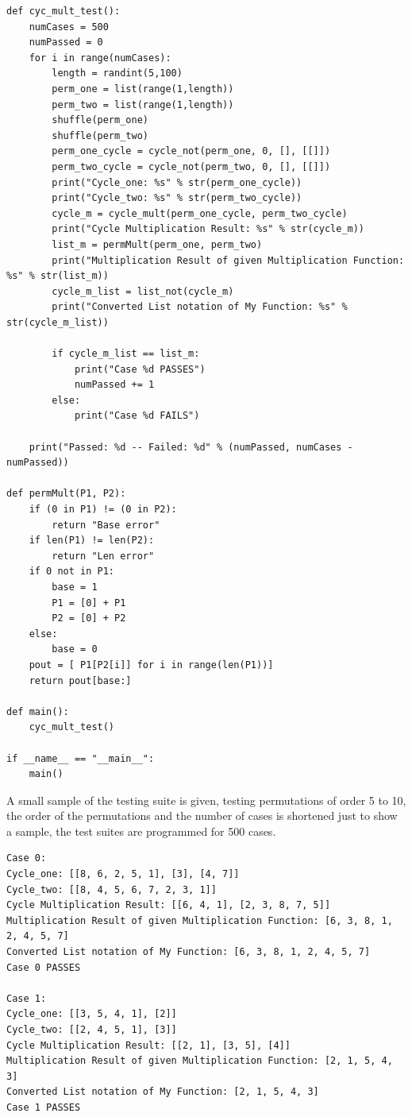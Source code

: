 \documentclass[12pt]{article}
\begin{document}
\begin{enumerate}
\begin{lstlisting}
def cyc_mult_test():
    numCases = 500
    numPassed = 0
    for i in range(numCases):
        length = randint(5,100)
        perm_one = list(range(1,length))
        perm_two = list(range(1,length))
        shuffle(perm_one)
        shuffle(perm_two)
        perm_one_cycle = cycle_not(perm_one, 0, [], [[]])
        perm_two_cycle = cycle_not(perm_two, 0, [], [[]])
        print("Cycle_one: %s" % str(perm_one_cycle))
        print("Cycle_two: %s" % str(perm_two_cycle))
        cycle_m = cycle_mult(perm_one_cycle, perm_two_cycle)
        print("Cycle Multiplication Result: %s" % str(cycle_m))
        list_m = permMult(perm_one, perm_two)
        print("Multiplication Result of given Multiplication Function: %s" % str(list_m))
        cycle_m_list = list_not(cycle_m)
        print("Converted List notation of My Function: %s" % str(cycle_m_list))

        if cycle_m_list == list_m:
            print("Case %d PASSES")
            numPassed += 1
        else:
            print("Case %d FAILS")

    print("Passed: %d -- Failed: %d" % (numPassed, numCases - numPassed))

def permMult(P1, P2):
    if (0 in P1) != (0 in P2):
        return "Base error"
    if len(P1) != len(P2):
        return "Len error"
    if 0 not in P1:
        base = 1
        P1 = [0] + P1
        P2 = [0] + P2
    else:
        base = 0
    pout = [ P1[P2[i]] for i in range(len(P1))]
    return pout[base:]

def main():
    cyc_mult_test()

if __name__ == "__main__":
    main()
    \end{lstlisting}
  
    A small sample of the testing suite is given, testing permutations of order 5 to 10, the order of the permutations and the number of cases is shortened just to show a sample, the test suites are programmed for 500 cases.
    \begin{lstlisting}
Case 0:
Cycle_one: [[8, 6, 2, 5, 1], [3], [4, 7]]
Cycle_two: [[8, 4, 5, 6, 7, 2, 3, 1]]
Cycle Multiplication Result: [[6, 4, 1], [2, 3, 8, 7, 5]]
Multiplication Result of given Multiplication Function: [6, 3, 8, 1, 2, 4, 5, 7]
Converted List notation of My Function: [6, 3, 8, 1, 2, 4, 5, 7]
Case 0 PASSES

Case 1:
Cycle_one: [[3, 5, 4, 1], [2]]
Cycle_two: [[2, 4, 5, 1], [3]]
Cycle Multiplication Result: [[2, 1], [3, 5], [4]]
Multiplication Result of given Multiplication Function: [2, 1, 5, 4, 3]
Converted List notation of My Function: [2, 1, 5, 4, 3]
Case 1 PASSES


\end{lstlisting}
\end{enumerate}
\end{document}
